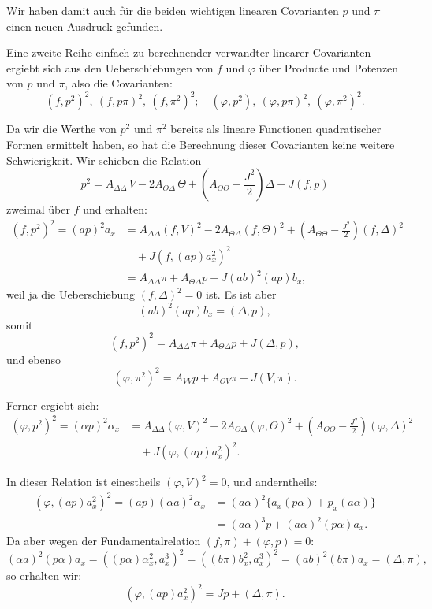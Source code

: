 \documentclass[11pt]{article}
\providecommand{\weberpage}[1]{}
\providecommand{\weq}[2]{\begin{equation}\tag{#1}#2\end{equation}}
\let\Delta\varDelta
\let\Theta\varTheta
\begin{document}
Wir haben damit auch für die beiden wichtigen linearen Covarianten $p$ und
$\pi$ einen neuen Ausdruck gefunden.

Eine zweite Reihe einfach zu berechnender verwandter linearer Covarianten
ergiebt sich aus den Ueberschiebungen von $f$ und $\varphi$ über Producte
und Potenzen von $p$ und $\pi$, also die Covarianten:
\[
(f, p^2)^2, \ (f, p\pi)^2, \ (f, \pi^2)^2; \quad (\varphi, p^2), \ (\varphi, p\pi)^2, \ (\varphi, \pi^2)^2. %
\]

Da wir die Werthe von $p^2$ und $\pi^2$ bereits als lineare Functionen
quadratischer Formen ermittelt haben, so hat die Berechnung dieser
Covarianten keine weitere Schwierigkeit. Wir schieben die Relation
\[
p^2 = A_{\Delta\Delta}\,V - 2A_{\Theta\Delta}\,\Theta + \left(A_{\Theta\Theta} - \frac{J^2}{2}\right)\Delta + J(f, p)
\]
zweimal über $f$ und erhalten:
\[
\begin{aligned}
(f, p^2)^2 = (ap)^2a_x &= A_{\Delta\Delta}(f,V)^2 - 2A_{\Theta\Delta}(f,\Theta)^2 + \left(A_{\Theta\Theta} - \frac{J^2}{2}\right)(f,\Delta)^2\\
&\quad + J(f, (ap)a_x^2)^2\\
&= A_{\Delta\Delta}\pi + A_{\Theta\Delta}p + J(ab)^2(ap)b_x,
\end{aligned}
\]
weil ja die Ueberschiebung $(f, \Delta)^2 = 0$ ist. Es ist aber
\[
(ab)^2(ap)b_x = (\Delta, p),
\]
somit
\weq{3}{(f, p^2)^2 = A_{\Delta\Delta}\pi + A_{\Theta\Delta}p + J(\Delta, p),}
und ebenso
\weq{4}{(\varphi, \pi^2)^2 = A_{VV}p + A_{\Theta V}\pi - J(V, \pi).}

Ferner ergiebt sich:
\[
\begin{aligned}
(\varphi, p^2)^2 = (\alpha p)^2\alpha_x &= A_{\Delta\Delta}(\varphi,V)^2 - 2A_{\Theta\Delta}(\varphi,\Theta)^2 + \left(A_{\Theta\Theta} - \frac{J^2}{2}\right)(\varphi,\Delta)^2\\
&\quad + J(\varphi, (ap)a_x^2)^2.
\end{aligned}
\]


\weberpage{342}
In dieser Relation ist einestheils $(\varphi, V)^2 = 0$, und anderntheils:
\[
\begin{aligned}
(\varphi, (ap)a_x^2)^2 = (ap)(\alpha a)^2\alpha_x &= (a\alpha)^2\{a_x(p\alpha) + p_x(a\alpha)\}\\
&= (a\alpha)^3p + (a\alpha)^2(p\alpha)a_x.
\end{aligned}
\]
Da aber wegen der Fundamentalrelation $(f, \pi) + (\varphi, p) = 0$:
\[
(\alpha a)^2(p\alpha)a_x = ((p\alpha)\alpha_x^2, a_x^3)^2 = ((b\pi)b_x^2, a_x^3)^2 = (ab)^2(b\pi)a_x = (\Delta,\pi),
\]
so erhalten wir:
\[
(\varphi, (ap)a_x^2)^2 = Jp + (\Delta,\pi).
\]
\end{document}
